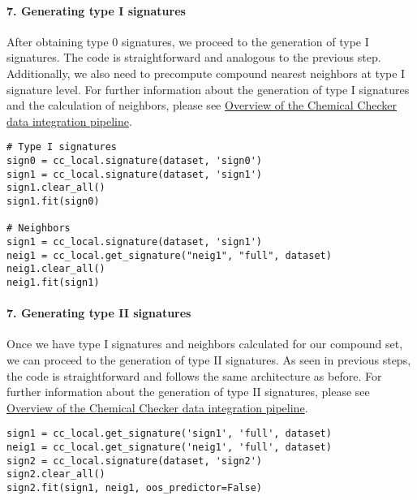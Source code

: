 \paragraph{7. Generating type I signatures} \leavevmode

After obtaining type 0 signatures, we proceed to the generation of type I signatures. The code is straightforward and analogous to the previous step. Additionally, we also need to precompute compound nearest neighbors at type I signature level. For further information about the generation of type I signatures and the calculation of neighbors, please see \hyperref[Overview of the Chemical Checker data integration pipeline]{Overview of the Chemical Checker data integration pipeline}. \\

\begin{lstlisting}
# Type I signatures
sign0 = cc_local.signature(dataset, 'sign0')
sign1 = cc_local.signature(dataset, 'sign1')
sign1.clear_all()
sign1.fit(sign0)

# Neighbors
sign1 = cc_local.signature(dataset, 'sign1')
neig1 = cc_local.get_signature("neig1", "full", dataset)
neig1.clear_all()
neig1.fit(sign1)
\end{lstlisting}

\paragraph{7. Generating type II signatures} \leavevmode

Once we have type I signatures and neighbors calculated for our compound set, we can proceed to the generation of type II signatures. As seen in previous steps, the code is straightforward and follows the same architecture as before. For further information about the generation of type II signatures, please see \hyperref[Overview of the Chemical Checker data integration pipeline]{Overview of the Chemical Checker data integration pipeline}. \\

\begin{lstlisting}
sign1 = cc_local.get_signature('sign1', 'full', dataset)
neig1 = cc_local.get_signature('neig1', 'full', dataset)
sign2 = cc_local.signature(dataset, 'sign2')
sign2.clear_all()
sign2.fit(sign1, neig1, oos_predictor=False)
\end{lstlisting}